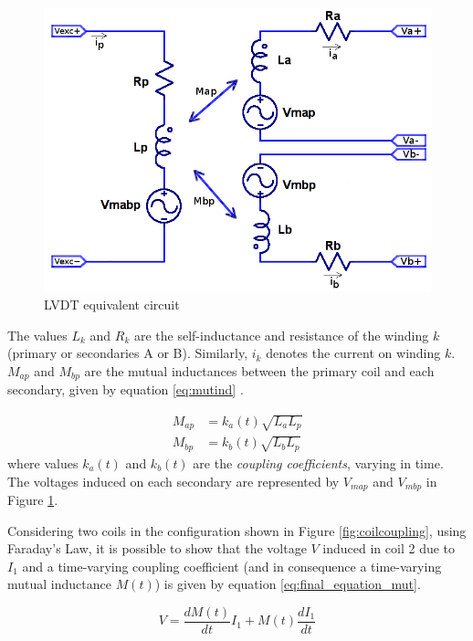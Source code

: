 \documentclass[conference]{IEEEtran}
\begin{document}
\begin{figure}[h!]
\centering
\includegraphics[scale=0.22]{pics/theory/lvdt_full_eq_circ.png}
\caption{LVDT equivalent circuit}
\label{fig:lvdtcirc}
\end{figure}
%
The values $L_k$ and $R_k$ are the self-inductance and resistance of the winding $k$ (primary or secondaries A or B). Similarly, $i_k$ denotes the current on winding $k$. $M_{ap}$ and $M_{bp}$ are the mutual inductances between the primary coil and each secondary, given by equation \ref{eq:mutind} \cite{eletrotutomutual}. 

\begin{equation}
\begin{split}
M_{ap} & = k_a(t) \sqrt{L_a L_p} \\
M_{bp} & = k_b(t) \sqrt{L_b L_p}
\end{split}
\label{eq:mutind}
\end{equation}
%
where values $k_a(t)$ and $k_b(t)$ are the {\it coupling coefficients}, varying in time. The voltages induced on each secondary are represented by $V_{map}$ and $V_{mbp}$ in Figure \ref{fig:lvdtcirc}. 

Considering two coils in the configuration shown in Figure \ref{fig:coilcoupling}, using Faraday's Law, it is possible to show that the voltage $V$ induced in coil 2 due to $I_1$ and a time-varying coupling coefficient (and in consequence a time-varying mutual inductance $M(t)$) is given by equation \ref{eq:final_equation_mut}.

\begin{equation}
V = \frac{dM(t)}{dt} I_1 + M(t) \frac{dI_1}{dt} 
\label{eq:final_equation_mut}
\end{equation}
\end{document}
